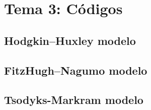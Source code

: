 \chapter{Tema 3: Códigos}

\section{Hodgkin–Huxley modelo}



\section{FitzHugh–Nagumo modelo}


\section{Tsodyks-Markram modelo}
